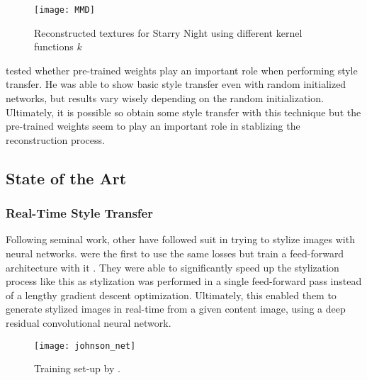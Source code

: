 \begin{figure}
    \texttt{[image: MMD]}
    \caption[]{Reconstructed textures for Starry Night using different kernel functions $k$ \cite{MMD}}
\end{figure}


\citeauthor*{LenDu} tested whether pre-trained weights play an important role when performing style transfer.
He was able to show basic style transfer even with random initialized networks, but results vary wisely depending on the random initialization.
Ultimately, it is possible so obtain some style transfer with this technique but the pre-trained weights seem to play an important role in stablizing the reconstruction process.

\subsection{State of the Art}

\subsubsection{Real-Time Style Transfer}
Following \citeauthor*{gatys} seminal work, other have followed suit in trying to stylize images with neural networks.
\citeauthor*{Johnson} were the first to use the same losses but train a feed-forward architecture with it \cite{johnson}.
They were able to significantly speed up the stylization process like this as stylization was performed in a single feed-forward pass instead of a lengthy gradient descent optimization.
Ultimately, this enabled them to generate stylized images in real-time from a given content image, using a deep residual convolutional neural network.
\begin{figure*}
    \texttt{[image: johnson\_net]}
    \caption[]{Training set-up by \citeauthor*{johnson}. \cite{johnson}}
\end{figure*}


